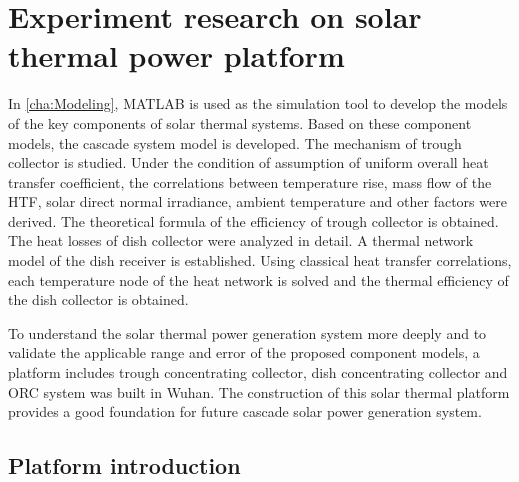 \chapter{Experiment research on solar thermal power platform}

In \autoref{cha:Modeling}, MATLAB is used as the simulation tool to develop the models of the key components of solar thermal systems. Based on these component models, the cascade system model is developed.
The mechanism of trough collector is studied. Under the condition of assumption of uniform overall heat transfer coefficient, the correlations between temperature rise, mass flow of the HTF, solar direct normal irradiance, ambient temperature and other factors were derived. The theoretical formula of the efficiency of trough collector is obtained.
The heat losses of dish collector were analyzed in detail. A thermal network model of the dish receiver is established. Using classical heat transfer correlations, each temperature node of the heat network is solved and the thermal efficiency of the dish collector is obtained.

To understand the solar thermal power generation system more deeply and to validate the applicable range and error of the proposed component models, a platform includes trough concentrating collector, dish concentrating collector and ORC system was built in Wuhan. The construction of this solar thermal platform provides a good foundation for future cascade solar power generation system.

\section{Platform introduction}


